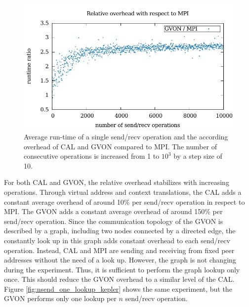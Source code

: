 \begin{figure}[H]
\begin{minipage}[t]{0.5\textwidth}
    \includegraphics[width=\textwidth]{plots/50_nsend_overhead_gvon}
  \end{minipage}%
  \caption{Average run-time of a single send/recv operation and the
    according overhead of CAL and GVON compared to MPI. The number of
    consecutive operations is increased from 1 to $10^3$ by a step
    size of 10. }
  \label{fig:nsend_kepler}
\end{figure}

\noindent For both CAL and GVON, the relative overhead stabilizes with
increasing operations.  Through virtual address and context
translations, the CAL adds a constant average overhead of around 10\%
per send/recv operation in respect to MPI. The GVON adds a constant
average overhead of around 150\% per send/recv operation.  Since the
communication topology of the GVON is described by a graph, including
two nodes connected by a directed edge, the constantly look up in this
graph adds constant overhead to each send/recv operation.  Instead,
CAL and MPI are sending and receiving from fixed peer addresses without the need of
a look up.  However, the graph is not changing during the
experiment. Thus, it is sufficient to perform the graph lookup only
once. This should reduce the GVON overhead to a similar level of the
CAL. Figure \ref{fig:nsend_one_lookup_kepler} shows the same
experiment, but the GVON performs only one lookup per $n$ send/recv
operation.

